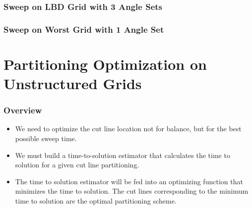 \documentclass[xcolor={usenames,dvipsnames,svgnames,table}]{beamer}
\begin{document}
\begin{frame}[t]\frametitle{Sweep on LBD Grid with 3 Angle Sets}
\end{frame}


\begin{frame}[t]\frametitle{Sweep on Worst Grid with 1 Angle Set}
\end{frame}

\section{Partitioning Optimization on Unstructured Grids}

\begin{frame}[t]\frametitle{Overview}
\begin{block}{}
\begin{itemize}
	\item We need to optimize the cut line location not for balance, but for the best possible sweep time.
	\item We must build a time-to-solution estimator that calculates the time to solution for a given cut line partitioning.
	\item The time to solution estimator will be fed into an optimizing function that minimizes the time to solution. The cut lines corresponding to the minimum time to solution are the optimal partitioning scheme.
\end{itemize}
\end{block}
\end{frame}
\end{document}
